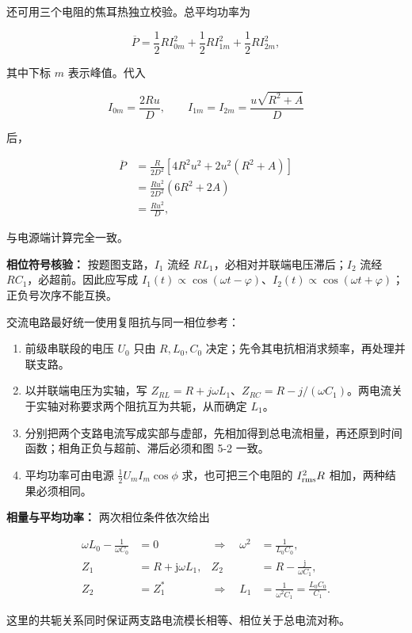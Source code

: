 \documentclass[12pt,a4paper,UTF8]{ctexart}
\newcommand{\tightlist}{\setlength{\itemsep}{0pt}\setlength{\parskip}{0pt}}
\begin{document}
还可用三个电阻的焦耳热独立校验。总平均功率为

\[\overline P
=\frac12R I_{0m}^2
+\frac12R I_{1m}^2
+\frac12R I_{2m}^2,\]

其中下标 \(m\) 表示峰值。代入

\[I_{0m}=\frac{2Ru}{D},\qquad
I_{1m}=I_{2m}=\frac{u\sqrt{R^2+A}}{D}\]

后，

\[\begin{aligned}
\overline P
&=\frac{R}{2D^2}\left[4R^2u^2+2u^2(R^2+A)\right]\\
&=\frac{Ru^2}{2D^2}(6R^2+2A)\\
&=\frac{Ru^2}{D},
\end{aligned}\]

与电源端计算完全一致。

\textbf{相位符号核验：} 按题图支路，\(I_1\) 流经
\(RL_1\)，必相对并联端电压滞后；\(I_2\) 流经
\(RC_1\)，必超前。因此应写成
\(I_1(t)\propto\cos(\omega t-\varphi)\)、\(I_2(t)\propto\cos(\omega t+\varphi)\)；正负号次序不能互换。

交流电路最好统一使用复阻抗与同一相位参考：

\begin{enumerate}
\def\labelenumi{\arabic{enumi}.}
\tightlist
\item
  前级串联段的电压 \(U_0\) 只由 \(R,L_0,C_0\)
  决定；先令其电抗相消求频率，再处理并联支路。
\item
  以并联端电压为实轴，写
  \(Z_{RL}=R+j\omega L_1\)、\(Z_{RC}=R-j/(\omega C_1)\)。两电流关于实轴对称要求两个阻抗互为共轭，从而确定
  \(L_1\)。
\item
  分别把两个支路电流写成实部与虚部，先相加得到总电流相量，再还原到时间函数；相角正负与超前、滞后必须和图
  5-2 一致。
\item
  平均功率可由电源 \(\tfrac12U_mI_m\cos\phi\) 求，也可把三个电阻的
  \(I_{\rm rms}^2R\) 相加，两种结果必须相同。
\end{enumerate}

\textbf{相量与平均功率：} 两次相位条件依次给出

\[\begin{aligned}
\omega L_0-\frac1{\omega C_0}&=0
&\Longrightarrow\quad \omega^2&=\frac1{L_0C_0},\\
Z_1&=R+\mathrm j\omega L_1,
&Z_2&=R-\frac{\mathrm j}{\omega C_1},\\
Z_2&=Z_1^*
&\Longrightarrow\quad L_1&=\frac1{\omega^2C_1}
=\frac{L_0C_0}{C_1}.
\end{aligned}\]

这里的共轭关系同时保证两支路电流模长相等、相位关于总电流对称。
\end{document}
